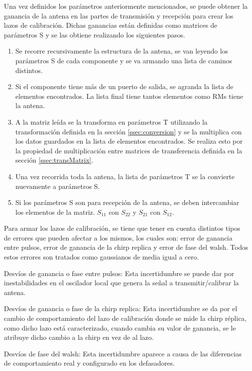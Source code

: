Una vez definidos los parámetros anteriormente mencionados, se puede obtener la ganancia de la antena en las partes de 
transmisión y recepción para crear los lazos de calibración. Dichas ganancias están definidas como matrices de parámetros
S y se las obtiene realizando los siguientes pasos.

\begin{enumerate}
	\item Se recorre recursivamente la estructura de la antena, se van leyendo los parámetros S de cada componente y se va 
		armando una lista de caminos distintos.
	\item Si el componente tiene más de un puerto de salida, se agranda la lista de elementos encontrados. La lista final tiene 
		tantos elementos como RMs tiene la antena.
	\item A la matriz leída se la transforma en parámetros T utilizando la transformación definida en la sección 
		\ref{ssec:conversion} y se la multiplica con los datos guardados en la lista de elementos encontrados. Se realiza esto 
		por la propiedad de multiplicación entre matrices de transferencia definida en la sección \ref{ssec:transMatrix}.
	\item Una vez recorrida toda la antena, la lista de parámetros T se la convierte nuevamente a parámetros S.
	\item Si los parámetros S son para recepción de la antena, se deben intercambiar los elementos de la matriz. $S_{11}$ con 
		$S_{22}$ y $S_{21}$ con $S_{12}$.
\end{enumerate}

Para armar los lazos de calibración, se tiene que tener en cuenta distintos tipos de errores que pueden afectar a los mismos, 
los cuales son: error de ganancia entre pulsos, error de ganancia de la chirp replica y error de fase del walsh. Todos estos 
errores son tratados como gaussianos de media igual a cero.

Desvíos de ganancia o fase entre pulsos: Esta incertidumbre se puede dar por inestabilidades en el oscilador local que genera 
la señal a transmitir/calibrar la antena.

Desvíos de ganancia o fase de la chirp replica: Esta incertidumbre se da por el cambio de comportamiento del lazo de 
calibración donde se mide la chirp réplica, como dicho lazo está caracterizado, cuando cambia su valor de ganancia, se le 
atribuye dicho cambio a la chirp en vez de al lazo.

Desvíos de fase del walsh: Esta incertidumbre aparece a causa de las diferencias de comportamiento real y configurado en los 
defasadores. 

